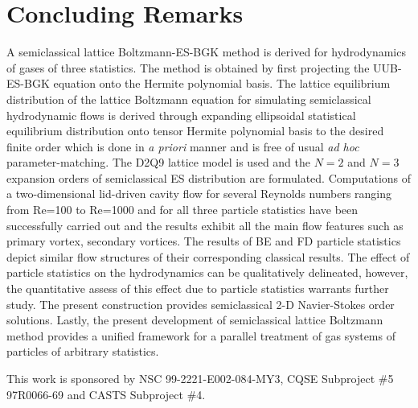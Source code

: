 \documentclass[doublecol]{epl2}
\begin{document}
\section{Concluding Remarks}
A semiclassical lattice Boltzmann-ES-BGK method is derived for hydrodynamics of gases of three statistics. The method is obtained by first projecting the UUB-ES-BGK equation onto the Hermite polynomial basis.  The lattice equilibrium distribution of the lattice Boltzmann equation for simulating semiclassical hydrodynamic flows is derived through expanding ellipsoidal statistical equilibrium distribution onto tensor Hermite polynomial basis to the desired finite order which is done in {\sl a priori} manner and is free of usual {\sl ad hoc} parameter-matching. The D2Q9 lattice model is used and the $N=2$ and $N=3$ expansion orders of semiclassical ES distribution are formulated. Computations of a two-dimensional lid-driven cavity flow for several Reynolds numbers ranging from Re=100 to Re=1000 and for all three particle statistics have been successfully carried out and the results exhibit all the main flow features such as primary vortex, secondary vortices. The results of BE and FD particle statistics depict similar flow structures of their corresponding classical results. The effect of particle statistics on the hydrodynamics can be qualitatively delineated, however, the quantitative assess of this effect due to particle statistics warrants further study.  The present construction provides semiclassical 2-D Navier-Stokes order solutions. Lastly, the present development of semiclassical lattice Boltzmann method provides a unified framework for a parallel treatment of gas systems of particles of arbitrary statistics.

\acknowledgments
This work is sponsored by NSC 99-2221-E002-084-MY3, CQSE Subproject \#5 97R0066-69 and CASTS Subproject \#4.
\end{document}
